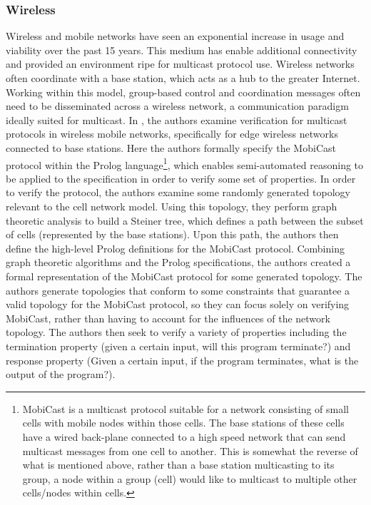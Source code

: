 \documentclass[10pt, journal]{IEEEtran}
\begin{document}
\subsubsection{Wireless}
Wireless and mobile networks have seen an exponential increase in usage and viability over the past 15 years. This medium has enable additional connectivity and provided an environment ripe for multicast protocol use. Wireless networks often coordinate with a base station, which acts as a hub to the greater Internet. Working within this model, group-based control and coordination messages often need to be disseminated across a wireless network, a communication paradigm ideally suited for multicast.
\bigbreak
In \cite{Borujerdi2004}, the authors examine verification for multicast protocols in wireless mobile networks, specifically for edge wireless networks connected to base stations. Here the authors formally specify the MobiCast protocol\cite{Tan2000} within the Prolog language\footnote{MobiCast is a multicast protocol suitable for a network consisting of small cells with mobile nodes within those cells. The base stations of these cells have a wired back-plane connected to a high speed network that can send multicast messages from one cell to another. This is somewhat the reverse of what is mentioned above, rather than a base station multicasting to its group, a node within a group (cell) would like to multicast to multiple other cells/nodes within cells.}, which enables semi-automated reasoning to be applied to the specification in order to verify some set of properties.
\bigbreak
In order to verify the protocol, the authors examine some randomly generated topology relevant to the cell network model. Using this topology, they perform graph theoretic analysis to build a Steiner tree, which defines a path between the subset of cells (represented by the base stations). Upon this path, the authors then define the high-level Prolog definitions for the MobiCast protocol. 
\bigbreak
Combining graph theoretic algorithms and the Prolog specifications, the authors created a formal representation of the MobiCast protocol for some generated topology. The authors generate topologies that conform to some constraints that guarantee a valid topology for the MobiCast protocol, so they can focus solely on verifying MobiCast, rather than having to account for the influences of the network topology. The authors then seek to verify a variety of properties including the termination property (given a certain input, will this program terminate?) and response property (Given a certain input, if the program terminates, what is the output of the program?).
\end{document}
